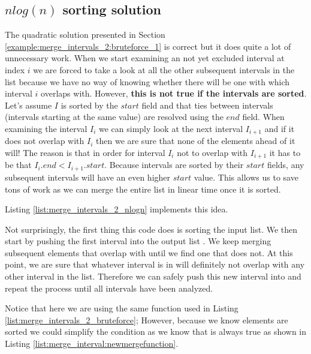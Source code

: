 \subsection{$nlog(n)$ sorting solution}
\label{example:merge_intervals_2:sorting_1}
The quadratic solution presented in Section \ref{example:merge_intervals_2:bruteforce_1} is correct but it does quite a lot of unnecessary work.
When we start examining an not yet excluded interval at index $i$ we are forced to take a look at all the other subsequent intervals in the list because we have no way of knowing whether there will be one with which interval $i$ overlaps with.
However, \textbf{this is not true if the intervals are sorted}. 
Let's assume $I$ is sorted by the $start$ field and that ties between intervals (intervals starting at the same value) are resolved using the $end$ field.
When examining the interval $I_i$ we can simply look at the next interval $I_{i+1}$ and if it does not overlap with $I_i$ then we are sure that none of the elements ahead of it will!
The reason is that in order for interval $I_i$ not to overlap with $I_{i+1}$ it has to be that $I_i.end < I_{i+1}.start$.
Because intervals are sorted by their $start$ fields, any subsequent intervals will have an even higher $start$ value. 
This allows us to save tons of work as we can merge the entire list in linear time once it is sorted. 

Listing \ref{list:merge_intervals_2_nlogn} implements this idea.



Not surprisingly, the first thing this code does is sorting the input list.
We then start by pushing the first interval into the output list .
We keep merging subsequent elements that overlap with  until we find one that does not.
At this point, we are sure that whatever interval is in  will definitely not overlap with any other interval in the list.
Therefore we can safely push this new interval into  and repeat the process until all intervals have been analyzed.

Notice that here we are using the same  function used in Listing \ref{list:merge_intervals_2_bruteforce};
However, because we know elements are sorted we could simplify the condition  as we know that  is always true as shown in Listing \ref{list:merge_interval:newmergefunction}.

